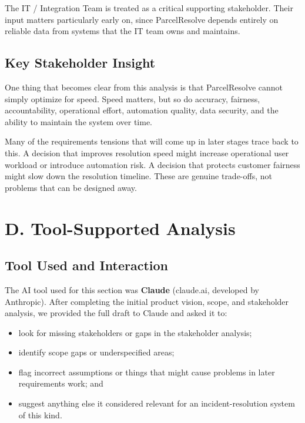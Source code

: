 \documentclass[11pt,a4paper]{article}
\begin{document}
The IT / Integration Team is treated as a critical supporting
stakeholder. Their input matters particularly early on, since
ParcelResolve depends entirely on reliable data from systems that
the IT team owns and maintains.


\subsection{Key Stakeholder Insight}

One thing that becomes clear from this analysis is that ParcelResolve
cannot simply optimize for speed. Speed matters, but so do accuracy,
fairness, accountability, operational effort, automation quality,
data security, and the ability to maintain the system over time.

Many of the requirements tensions that will come up in later stages
trace back to this. A decision that improves resolution speed might
increase operational user workload or introduce automation risk. A
decision that protects customer fairness might slow down the
resolution timeline. These are genuine trade-offs, not problems that
can be designed away.



\section{D. Tool-Supported Analysis}

\subsection{Tool Used and Interaction}

The AI tool used for this section was \textbf{Claude} (claude.ai,
developed by Anthropic). After completing the initial product vision,
scope, and stakeholder analysis, we provided the full draft to
Claude and asked it to:

\begin{itemize}
    \item look for missing stakeholders or gaps in the stakeholder
    analysis;
    \item identify scope gaps or underspecified areas;
    \item flag incorrect assumptions or things that might cause
    problems in later requirements work; and
    \item suggest anything else it considered relevant for an
    incident-resolution system of this kind.
\end{itemize}
\end{document}
